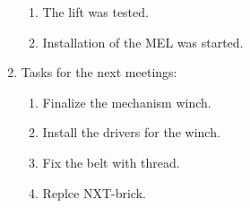\begin{enumerate}
\begin{enumerate}
	  \item	The lift was tested.
	  
	  \item	Installation of the MEL was started.
	   
    \end{enumerate}
    
	\item Tasks for the next meetings:
	\begin{enumerate}
	  \item	Finalize the mechanism winch.
	  
	  \item	Install the drivers for the winch.
	  
	  \item	Fix the belt with thread.
	  
	  \item	Replce NXT-brick.
	  
    \end{enumerate}     
\end{enumerate}
\fillpage
